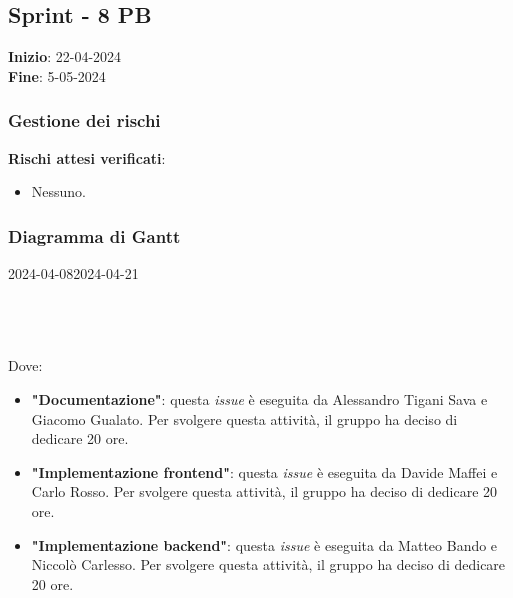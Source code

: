 \subsection{Sprint - 8 PB}
\textbf{Inizio}: 22-04-2024 \\
\textbf{Fine}: 5-05-2024

\subsubsection{Gestione dei rischi}
\textbf{Rischi attesi verificati}:

\begin{itemize}
	\item Nessuno.
\end{itemize}

\subsubsection{Diagramma di Gantt}

\begin{ganttchart}[
		x unit=0.6cm, %
		y unit chart=0.6cm,
		bar/.style={fill=blue!50},
		bar height=0.5,
		time slot format=isodate,
		time slot unit=day,
		vgrid,
		today=2024-04-08,
		today rule/.style={draw=red, ultra thick}
	]{2024-04-08}{2024-04-21}
	 \\
	 \\
	 \\
	 \\
\end{ganttchart}

Dove:
\begin{itemize}
	\item \textbf{"Documentazione"}: questa \textit{issue} è eseguita da
	      Alessandro Tigani Sava e Giacomo Gualato. Per svolgere questa attività, il gruppo ha deciso di
	      dedicare 20 ore.
	\item \textbf{"Implementazione frontend"}: questa \textit{issue} è eseguita
	      da Davide Maffei e Carlo Rosso. Per svolgere questa attività, il
	      gruppo ha deciso di dedicare 20 ore.
	\item \textbf{"Implementazione backend"}: questa \textit{issue} è eseguita da Matteo Bando e Niccolò Carlesso. Per svolgere questa attività, il
	      gruppo ha deciso di dedicare 20 ore.
\end{itemize}

